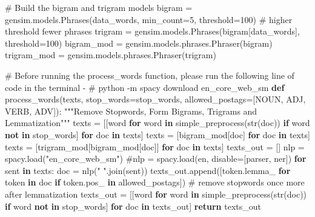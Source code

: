 \documentclass[
  letterpaper,
  DIV=11,
  numbers=noendperiod]{scrreprt}
\newenvironment{Shaded}{\begin{snugshade}}{\end{snugshade}}
\newcommand{\BuiltInTok}[1]{\textcolor[rgb]{0.00,0.23,0.31}{#1}}
\newcommand{\CommentTok}[1]{\textcolor[rgb]{0.37,0.37,0.37}{#1}}
\newcommand{\ControlFlowTok}[1]{\textcolor[rgb]{0.00,0.23,0.31}{\textbf{#1}}}
\newcommand{\DecValTok}[1]{\textcolor[rgb]{0.68,0.00,0.00}{#1}}
\newcommand{\KeywordTok}[1]{\textcolor[rgb]{0.00,0.23,0.31}{\textbf{#1}}}
\newcommand{\NormalTok}[1]{\textcolor[rgb]{0.00,0.23,0.31}{#1}}
\newcommand{\OperatorTok}[1]{\textcolor[rgb]{0.37,0.37,0.37}{#1}}
\newcommand{\StringTok}[1]{\textcolor[rgb]{0.13,0.47,0.30}{#1}}
\begin{document}
\begin{Shaded}
\begin{Highlighting}[]
\CommentTok{\# Build the bigram and trigram models}
\NormalTok{bigram }\OperatorTok{=}\NormalTok{ gensim.models.Phrases(data\_words, min\_count}\OperatorTok{=}\DecValTok{5}\NormalTok{, threshold}\OperatorTok{=}\DecValTok{100}\NormalTok{) }
\CommentTok{\# higher threshold fewer phrases}
\NormalTok{trigram }\OperatorTok{=}\NormalTok{ gensim.models.Phrases(bigram[data\_words], threshold}\OperatorTok{=}\DecValTok{100}\NormalTok{)  }
\NormalTok{bigram\_mod }\OperatorTok{=}\NormalTok{ gensim.models.phrases.Phraser(bigram)}
\NormalTok{trigram\_mod }\OperatorTok{=}\NormalTok{ gensim.models.phrases.Phraser(trigram)}

\CommentTok{\# Before running the process\_words function, please run the following line of code in the terminal {-} }
\CommentTok{\# python {-}m spacy download en\_core\_web\_sm}
\KeywordTok{def}\NormalTok{ process\_words(texts, stop\_words}\OperatorTok{=}\NormalTok{stop\_words, allowed\_postags}\OperatorTok{=}\NormalTok{[}\StringTok{\textquotesingle{}NOUN\textquotesingle{}}\NormalTok{, }\StringTok{\textquotesingle{}ADJ\textquotesingle{}}\NormalTok{, }\StringTok{\textquotesingle{}VERB\textquotesingle{}}\NormalTok{, }\StringTok{\textquotesingle{}ADV\textquotesingle{}}\NormalTok{]):}
    \CommentTok{"""Remove Stopwords, Form Bigrams, Trigrams and Lemmatization"""}
\NormalTok{    texts }\OperatorTok{=}\NormalTok{ [[word }\ControlFlowTok{for}\NormalTok{ word }\KeywordTok{in}\NormalTok{ simple\_preprocess(}\BuiltInTok{str}\NormalTok{(doc)) }\ControlFlowTok{if}\NormalTok{ word }\KeywordTok{not} \KeywordTok{in}\NormalTok{ stop\_words] }\ControlFlowTok{for}\NormalTok{ doc }\KeywordTok{in}\NormalTok{ texts]}
\NormalTok{    texts }\OperatorTok{=}\NormalTok{ [bigram\_mod[doc] }\ControlFlowTok{for}\NormalTok{ doc }\KeywordTok{in}\NormalTok{ texts]}
\NormalTok{    texts }\OperatorTok{=}\NormalTok{ [trigram\_mod[bigram\_mod[doc]] }\ControlFlowTok{for}\NormalTok{ doc }\KeywordTok{in}\NormalTok{ texts]}
\NormalTok{    texts\_out }\OperatorTok{=}\NormalTok{ []}
\NormalTok{    nlp }\OperatorTok{=}\NormalTok{ spacy.load(}\StringTok{"en\_core\_web\_sm"}\NormalTok{)}
    \CommentTok{\#nlp = spacy.load(\textquotesingle{}en\textquotesingle{}, disable=[\textquotesingle{}parser\textquotesingle{}, \textquotesingle{}ner\textquotesingle{}])}
    \ControlFlowTok{for}\NormalTok{ sent }\KeywordTok{in}\NormalTok{ texts:}
\NormalTok{        doc }\OperatorTok{=}\NormalTok{ nlp(}\StringTok{" "}\NormalTok{.join(sent)) }
\NormalTok{        texts\_out.append([token.lemma\_ }\ControlFlowTok{for}\NormalTok{ token }\KeywordTok{in}\NormalTok{ doc }\ControlFlowTok{if}\NormalTok{ token.pos\_ }\KeywordTok{in}\NormalTok{ allowed\_postags])}
    \CommentTok{\# remove stopwords once more after lemmatization}
\NormalTok{    texts\_out }\OperatorTok{=}\NormalTok{ [[word }\ControlFlowTok{for}\NormalTok{ word }\KeywordTok{in}\NormalTok{ simple\_preprocess(}\BuiltInTok{str}\NormalTok{(doc)) }\ControlFlowTok{if}\NormalTok{ word }\KeywordTok{not} \KeywordTok{in}\NormalTok{ stop\_words] }\ControlFlowTok{for}\NormalTok{ doc }\KeywordTok{in}\NormalTok{ texts\_out]    }
    \ControlFlowTok{return}\NormalTok{ texts\_out}


\end{Highlighting}
\end{Shaded}
\end{document}
